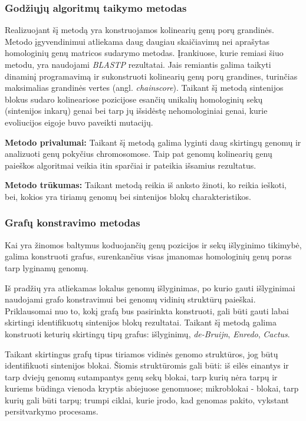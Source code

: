\documentclass[12pt]{article}
\begin{document}
\subsubsection*{Godžiųjų algoritmų taikymo metodas}
Realizuojant šį metodą yra konstruojamos kolinearių genų porų grandinės. Metodo
įgyvendinimui atliekama daug daugiau skaičiavimų nei aprašytas homologinių genų
matricos sudarymo metodas. Įrankiuose, kurie remiasi šiuo metodu, yra naudojami
\emph{BLASTP} rezultatai. Jais remiantis galima taikyti dinaminį programavimą
ir sukonstruoti kolinearių genų porų grandines, turinčias maksimalias grandinės
vertes (angl. \emph{chainscore}). Taikant šį metodą sintenijos blokus sudaro
kolineariose pozicijose esančių unikalių homologinių sekų (sintenijos inkarų)
genai bei tarp jų išsidėstę nehomologiniai genai, kurie evoliucijos eigoje buvo
paveikti mutacijų.

\textbf{Metodo privalumai:} Taikant šį metodą galima lyginti daug skirtingų
genomų ir analizuoti genų pokyčius chromosomose. Taip pat genomų kolinearių
genų paieškos algoritmai veikia itin sparčiai ir pateikia išsamius rezultatus.

\textbf{Metodo trūkumas:} Taikant metodą reikia iš anksto žinoti, ko reikia
ieškoti, bei, kokios yra tiriamų genomų bei sintenijos blokų charakteristikos.

\subsubsection*{Grafų konstravimo metodas}
Kai yra žinomos baltymus koduojančių genų pozicijos ir sekų išlyginimo tikimybė,
galima konstruoti grafus, surenkančius visas įmanomas homologinių genų poras
tarp lyginamų genomų.

Iš pradžių yra atliekamas lokalus genomų išlyginimas, po kurio gauti išlyginimai
naudojami grafo konstravimui bei genomų vidinių struktūrų paieškai. Priklausomai
nuo to, kokį grafą bus pasirinkta konstruoti, gali būti gauti labai skirtingi
identifikuotų sintenijos blokų rezultatai. Taikant šį metodą galima konstruoti
keturių skirtingų tipų grafus: išlyginimų, \emph{de-Bruijn}, \emph{Enredo},
\emph{Cactus}.

Taikant skirtingus grafų tipus tiriamos vidinės genomo struktūros, jog būtų
identifikuoti sintenijos blokai. Šiomis struktūromis gali būti: iš eilės
einantys ir tarp dviejų genomų sutampantys genų sekų blokai, tarp kurių nėra
tarpų ir kuriems būdinga vienoda kryptis abiejuose genomuose; mikroblokai -
blokai, tarp kurių gali būti tarpų; trumpi ciklai, kurie įrodo, kad genomas
pakito, vykstant persitvarkymo procesams.
\end{document}
